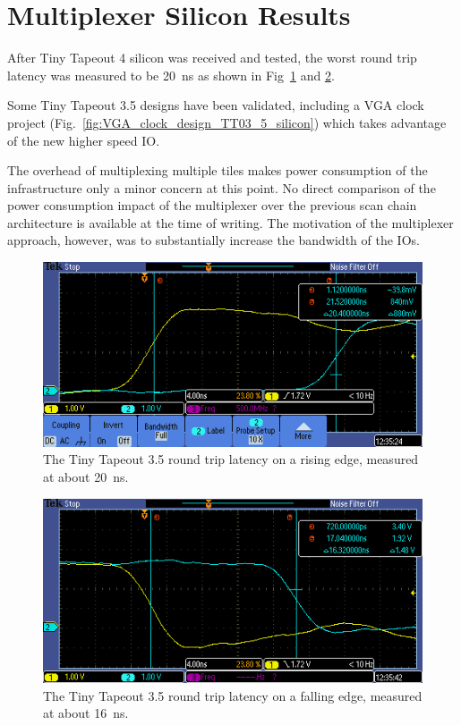 \section{Multiplexer Silicon Results}
\label{sec:multiplexer_silicon_res}
After Tiny Tapeout 4 silicon was received and tested, the worst round trip latency was measured to be \qty{20}{\ns} as shown in Fig~\ref{fig:round_trip_latency_rising_edge} and \ref{fig:round_trip_latency_falling_edge}.

Some Tiny Tapeout 3.5 designs have been validated, including a VGA clock project (Fig.~\ref{fig:VGA_clock_design_TT03_5_silicon}) which takes advantage of the new higher speed IO.

The overhead of multiplexing multiple tiles makes power consumption of the infrastructure only a minor concern at this point. No direct comparison of the power consumption impact of the multiplexer over the previous scan chain architecture is available at the time of writing. The motivation of the multiplexer approach, however, was to substantially increase the bandwidth of the IOs.

\begin{figure}[!t]
\centering
\includegraphics[width=\columnwidth]{./Figs/tt3p5 rising latency.PNG}
\caption{The Tiny Tapeout 3.5 round trip latency on a rising edge, measured at about \qty{20}{\ns}.}
\label{fig:round_trip_latency_rising_edge}
\end{figure}

\begin{figure}[!t]
\centering
\includegraphics[width=\columnwidth]{./Figs/tt3p5 falling latency.PNG}
\caption{The Tiny Tapeout 3.5 round trip latency on a falling edge, measured at about \qty{16}{\ns}.}
\label{fig:round_trip_latency_falling_edge}
\end{figure}

